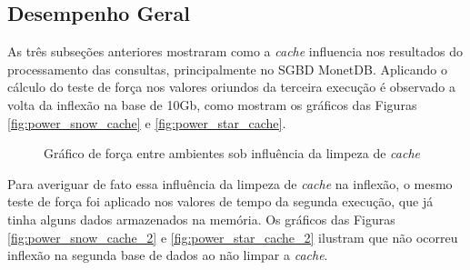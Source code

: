 \subsection{Desempenho Geral}

As três subseções anteriores mostraram como a \textit{cache} influencia nos resultados do processamento das consultas, principalmente no SGBD MonetDB. Aplicando o cálculo do teste de força nos valores oriundos da terceira execução é observado a volta da inflexão na base de 10Gb, como mostram os gráficos das Figuras \ref{fig:power_snow_cache} e \ref{fig:power_star_cache}.

\begin{figure}[htpb]
        \centering
        \caption{Gráfico de força entre ambientes sob influência da limpeza de \textit{cache}}
        \label{fig:power_cache}
\end{figure}

Para averiguar de fato essa influência da limpeza de \textit{cache} na inflexão, o mesmo teste de força foi aplicado nos valores de tempo da segunda execução, que já tinha alguns dados armazenados na memória. Os gráficos das Figuras \ref{fig:power_snow_cache_2} e \ref{fig:power_star_cache_2} ilustram que não ocorreu inflexão na segunda base de dados ao não limpar a \textit{cache}.

